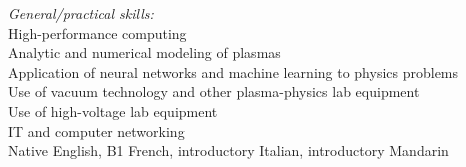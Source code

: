 \documentclass{rpires}
\begin{document}
\begin{resume}
\textit{General/practical skills:}\\
High-performance computing \\
Analytic and numerical modeling of plasmas \\
Application of neural networks and machine learning to physics problems\\
Use of vacuum technology and other plasma-physics lab equipment\\
Use of high-voltage lab equipment\\
IT and computer networking \\
Native English, B1 French, introductory Italian, introductory Mandarin
\end{resume} 
\end{document}
